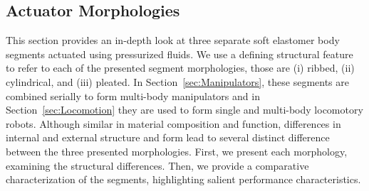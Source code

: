 \subsection{Actuator Morphologies}
\label{subsec:Actuators, Actuator Morphologies}
This section provides an in-depth look at three separate soft elastomer body segments actuated using pressurized fluids.
%
We use a defining structural feature to refer to each of the presented segment morphologies, those are (i) ribbed, (ii) cylindrical, and (iii) pleated.
%
In Section~\ref{sec:Manipulators}, these segments are combined serially to form multi-body manipulators and in Section~\ref{sec:Locomotion} they are used to form single and multi-body locomotory robots.
%
Although similar in material composition and function, differences in internal and external structure and form lead to several distinct difference between the three presented morphologies.
%
First, we present each morphology, examining the structural differences.
%
Then, we provide a comparative characterization of the segments, highlighting salient performance characteristics.

